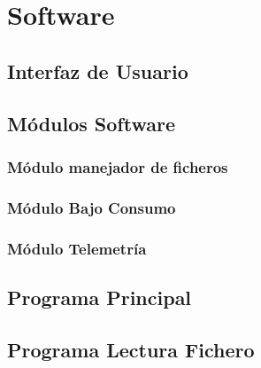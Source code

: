 \section{Software}

\subsection{Interfaz de Usuario}\label{subsec:thingsboard}


\subsection{Módulos Software}
\subsubsection{Módulo manejador de ficheros}\label{subsubsec:ManejadorFicheros}








\subsubsection{Módulo Bajo Consumo}


\subsubsection{Módulo Telemetría}


\subsection{Programa Principal}


\subsection{Programa Lectura Fichero}


